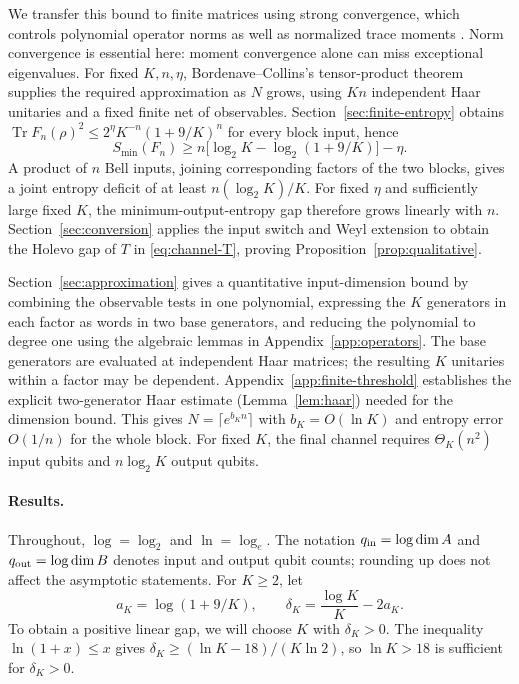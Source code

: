 \documentclass[11pt]{article}
\numberwithin{equation}{section}
\theoremstyle{boldremark}\newtheorem{remark}[theorem]{Remark}
\DeclareMathOperator{\Tr}{Tr}
\newcommand{\smin}{S_{\min}}
\begin{document}
We transfer this bound to finite matrices using strong convergence,
which controls polynomial operator norms as well as normalized trace
moments \cite{CM,BC}. Norm convergence is essential here: moment
convergence alone can miss exceptional eigenvalues.
For fixed $K,n,\eta$, Bordenave--Collins's tensor-product theorem
\cite[Theorem~9.2]{BC} supplies the required approximation as $N$
grows, using $Kn$ independent Haar unitaries and a fixed finite net
of observables. Section~\ref{sec:finite-entropy} obtains
$\Tr F_n(\rho)^2\le2^\eta K^{-n}(1+9/K)^n$ for every block input,
hence
\[
 \smin(F_n)\ge n\bigl[\log_2K-\log_2(1+9/K)\bigr]-\eta.
\]
A product of $n$ Bell inputs, joining corresponding factors of the
two blocks, gives a joint entropy deficit of at least
$n(\log_2K)/K$. For fixed $\eta$ and sufficiently large fixed $K$,
the minimum-output-entropy gap therefore grows linearly with $n$.
Section~\ref{sec:conversion} applies the input switch and Weyl extension
to obtain the Holevo gap of $T$ in \eqref{eq:channel-T}, proving
Proposition~\ref{prop:qualitative}.

Section~\ref{sec:approximation} gives a quantitative input-dimension bound
by combining the observable tests in one polynomial, expressing the
$K$ generators in each factor as words in two base generators, and
reducing the polynomial to degree one using the algebraic lemmas
in Appendix~\ref{app:operators}. The base generators are
evaluated at independent Haar matrices; the resulting $K$ unitaries
within a factor may be dependent. Appendix~\ref{app:finite-threshold}
establishes the explicit two-generator Haar estimate
(Lemma~\ref{lem:haar}) needed for the dimension bound.
This gives $N=\lceil e^{b_Kn}\rceil$ with $b_K=O(\ln K)$ and entropy
error $O(1/n)$ for the whole block.
For fixed $K$, the final channel requires $\Theta_K(n^2)$ input
qubits and $n\log_2K$ output qubits.

\paragraph{Results.}
Throughout, $\log=\log_2$ and $\ln=\log_e$. The notation
$q_{\rm in}=\log\dim A$ and $q_{\rm out}=\log\dim B$ denotes input and
output qubit counts; rounding up does not affect the asymptotic statements.
For $K\ge2$, let
\begin{equation}
 a_K=\log(1+9/K),\qquad
 \delta_K=\frac{\log K}{K}-2a_K.
 \label{eq:delta}
\end{equation}
To obtain a positive linear gap, we will choose $K$ with $\delta_K>0$.
The inequality $\ln(1+x)\le x$ gives
$\delta_K\ge(\ln K-18)/(K\ln2)$, so $\ln K>18$ is sufficient
for $\delta_K>0$.
\end{document}
